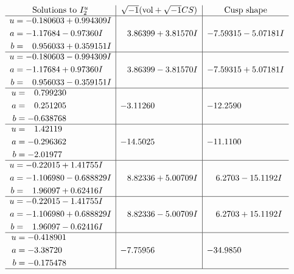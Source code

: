 \documentclass[1p]{elsarticle_modified}
\theoremstyle{definition}
\newcommand{\I}{\sqrt{-1}}
\begin{document}
$$\begin{array}{c|c|c}  
\text{Solutions to }I^u_{2}& \I (\text{vol} + \sqrt{-1}CS) & \text{Cusp shape}\\
 \hline 
\begin{aligned}
u &= -0.180603 + 0.994309 I \\
a &= -1.17684 - 0.97360 I \\
b &= \phantom{-}0.956033 + 0.359151 I\end{aligned}
 & \phantom{-}3.86399 + 3.81570 I & -7.59315 - 5.07181 I \\ \hline\begin{aligned}
u &= -0.180603 - 0.994309 I \\
a &= -1.17684 + 0.97360 I \\
b &= \phantom{-}0.956033 - 0.359151 I\end{aligned}
 & \phantom{-}3.86399 - 3.81570 I & -7.59315 + 5.07181 I \\ \hline\begin{aligned}
u &= \phantom{-}0.799230\phantom{ +0.000000I} \\
a &= \phantom{-}0.251205\phantom{ +0.000000I} \\
b &= -0.638768\phantom{ +0.000000I}\end{aligned}
 & -3.11260\phantom{ +0.000000I} & -12.2590\phantom{ +0.000000I} \\ \hline\begin{aligned}
u &= \phantom{-}1.42119\phantom{ +0.000000I} \\
a &= -0.296362\phantom{ +0.000000I} \\
b &= -2.01977\phantom{ +0.000000I}\end{aligned}
 & -14.5025\phantom{ +0.000000I} & -11.1100\phantom{ +0.000000I} \\ \hline\begin{aligned}
u &= -0.22015 + 1.41755 I \\
a &= -1.106980 - 0.688829 I \\
b &= \phantom{-}1.96097 + 0.62416 I\end{aligned}
 & \phantom{-}8.82336 + 5.00709 I & \phantom{-}6.2703 - 15.1192 I \\ \hline\begin{aligned}
u &= -0.22015 - 1.41755 I \\
a &= -1.106980 + 0.688829 I \\
b &= \phantom{-}1.96097 - 0.62416 I\end{aligned}
 & \phantom{-}8.82336 - 5.00709 I & \phantom{-}6.2703 + 15.1192 I \\ \hline\begin{aligned}
u &= -0.418901\phantom{ +0.000000I} \\
a &= -3.38720\phantom{ +0.000000I} \\
b &= -0.175478\phantom{ +0.000000I}\end{aligned}
 & -7.75956\phantom{ +0.000000I} & -34.9850\phantom{ +0.000000I}\\
 \hline 
 \end{array}$$\newpage\newpage\renewcommand{\arraystretch}{1}
\end{document}
